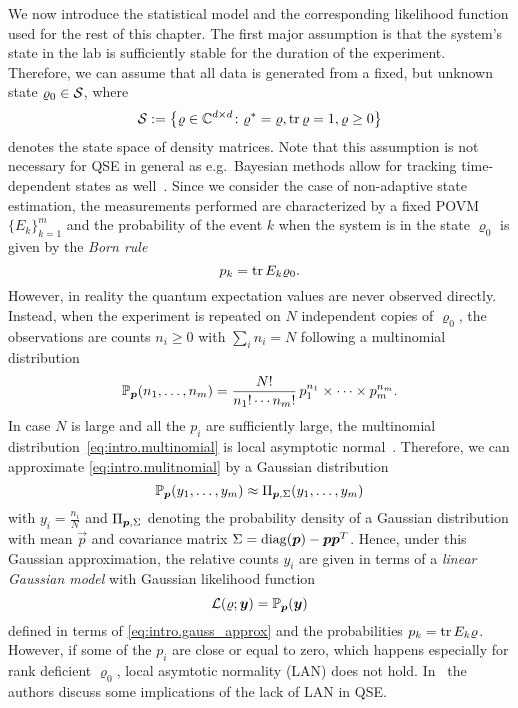 We now introduce the statistical model and the corresponding likelihood function used for the rest of this chapter.
The first major assumption is that the system's state in the lab is sufficiently stable for the duration of the experiment.
Therefore, we can assume that all data is generated from a fixed, but unknown state $\varrho_0 \in \mathcal{S}$, where
\[
  \mathcal{S} := \left\{ \varrho \in \mathbb{C}^{d \times d}\colon {\varrho}^\ast = \varrho, \operatorname{tr} \varrho = 1, \varrho \ge 0 \right\}
\]
denotes the state space of density matrices.
Note that this assumption is not necessary for QSE in general as e.g.\ Bayesian methods allow for tracking time-dependent states as well~\cite{Granade_2016_Practicala}.
Since we consider the case of non-adaptive state estimation, the measurements performed are characterized by a fixed POVM $\{E_k\}_{k=1}^m$ and the probability of the event $k$ when the system is in the state $\varrho_0$ is given by the \emph{Born rule}
\[
  p_k = \operatorname{tr} E_k \varrho_0.
\]
However, in reality the quantum expectation values are never observed directly.
Instead, when the experiment is repeated on $N$ independent copies of $\varrho_0$, the observations are counts $n_i \ge 0$ with $\sum_i n_i = N$
following a multinomial distribution
\[
  \label{eq:intro.mulitnomial}
  \mathbb{P}_{{\boldsymbol{p}}}(n_1, \ldots, n_m) = \frac{N!}{n_1! \cdots n_m!} \, p_1^{n_1} \times \cdots \times p_m^{n_m}.
\]
In case $N$ is large and all the $p_i$ are sufficiently large, the multinomial distribution~\eqref{eq:intro.multinomial} is local asymptotic normal~\cite{Severini_2005_Elements}.
Therefore, we can approximate \cref{eq:intro.mulitnomial} by a Gaussian distribution
\[
  \label{eq:intro.gauss_approx}
  \mathbb{P}_{{\boldsymbol{p}}}(y_1, \ldots, y_m) \approx \Pi_{{\boldsymbol{p}}, \Sigma}(y_1, \ldots, y_m)
\]
with $y_i = \frac{n_i}{N}$ and $\Pi_{{\boldsymbol{p}}, \Sigma}$ denoting the probability density of a Gaussian distribution with mean $\vec p$ and covariance matrix $\Sigma = \mathrm{diag}({\boldsymbol{p}}) - {\boldsymbol{p}} {\boldsymbol{p}}^T$.
Hence, under this Gaussian approximation, the relative counts $y_i$ are given in terms of a \emph{linear Gaussian model} with Gaussian likelihood function
\[
  \label{eq:intro.gauss_likelihood}
  \mathcal{L}(\varrho; {\boldsymbol{y}}) = \mathbb{P}_{{\boldsymbol{p}}}({\boldsymbol{y}})
\]
defined in terms of \cref{eq:intro.gauss_approx} and the probabilities $p_k = \operatorname{tr} E_k \varrho$.
However, if some of the $p_{i}$ are close or equal to zero, which happens especially for rank deficient $\varrho_{0}$, local asymtotic normality (LAN) does not hold.
In~\cite{Scholten_2016_Behavior} the authors discuss some implications of the lack of LAN in QSE.


